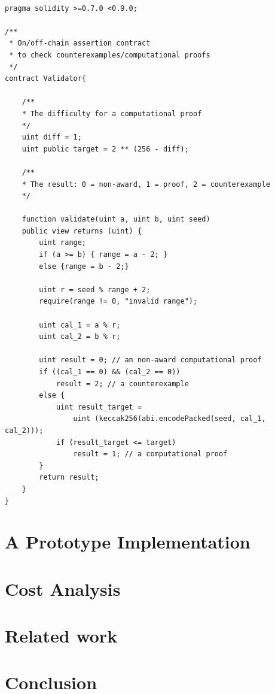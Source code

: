 \documentclass[runningheads]{llncs}
\begin{document}
\begin{lstlisting}[numbers=none]

pragma solidity >=0.7.0 <0.9.0;

/**
 * On/off-chain assertion contract 
 * to check counterexamples/computational proofs
 */
contract Validator{

    /**
    * The difficulty for a computational proof
    */
    uint diff = 1;
    uint public target = 2 ** (256 - diff); 

    /**
    * The result: 0 = non-award, 1 = proof, 2 = counterexample
    */

    function validate(uint a, uint b, uint seed)
    public view returns (uint) {
        uint range;
        if (a >= b) { range = a - 2; }
        else {range = b - 2;}
        
        uint r = seed % range + 2;
        require(range != 0, "invalid range");

        uint cal_1 = a % r;
        uint cal_2 = b % r;

        uint result = 0; // an non-award computational proof 
        if ((cal_1 == 0) && (cal_2 == 0))  
            result = 2; // a counterexample
        else {
            uint result_target = 
                uint (keccak256(abi.encodePacked(seed, cal_1, cal_2)));
            if (result_target <= target) 
                result = 1; // a computational proof      
        }              
        return result;           
    }
}

\end{lstlisting}

\section{A Prototype Implementation}
\section{Cost Analysis}
\section{Related work}
\section{Conclusion}

\newpage


\newpage


\end{document}
